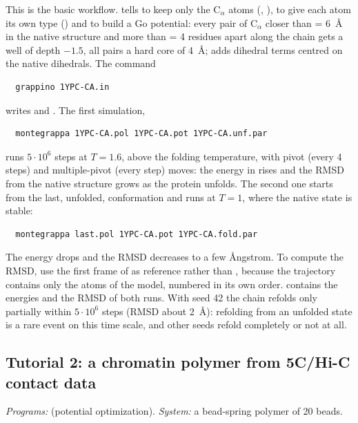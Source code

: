 \documentclass[11pt,a4paper]{article}
\begin{document}
This is the basic workflow.  tells  to keep only
the C$_\alpha$ atoms (, ), to give
each atom its own type () and to build a Go potential: every
pair of C$_\alpha$ closer than  = 6~\AA{} in the native
structure and more than  = 4 residues apart along the chain gets a
well of depth $-1.5$, all pairs a hard core of 4~\AA; 
adds dihedral terms centred on the native dihedrals. The command
\begin{Verbatim}
  grappino 1YPC-CA.in
\end{Verbatim}
writes  and . The first simulation,
\begin{Verbatim}
  montegrappa 1YPC-CA.pol 1YPC-CA.pot 1YPC-CA.unf.par
\end{Verbatim}
runs $5\cdot10^6$ steps at $T=1.6$, above the folding temperature, with
pivot (every 4 steps) and multiple-pivot (every step) moves: the energy in
 rises and the RMSD from the native structure grows as the
protein unfolds. The second one starts from the last, unfolded,
conformation and runs at $T=1$, where the native state is stable:
\begin{Verbatim}
  montegrappa last.pol 1YPC-CA.pot 1YPC-CA.fold.par
\end{Verbatim}
The energy drops and the RMSD decreases to a few \AA{}ngstrom. To compute
the RMSD, use the first frame of  as reference rather than
, because the trajectory contains only the atoms of the model,
numbered in its own order.  contains the energies and the RMSD
of both runs. With seed 42 the chain refolds only partially within $5\cdot10^6$
steps (RMSD about 2~\AA): refolding from an unfolded state is a rare event
on this time scale, and other seeds refold completely or not at all.

\subsection{Tutorial 2: a chromatin polymer from 5C/Hi-C contact data}
\emph{Programs:}  (potential optimization).
\emph{System:} a bead-spring polymer of 20 beads.
\end{document}
